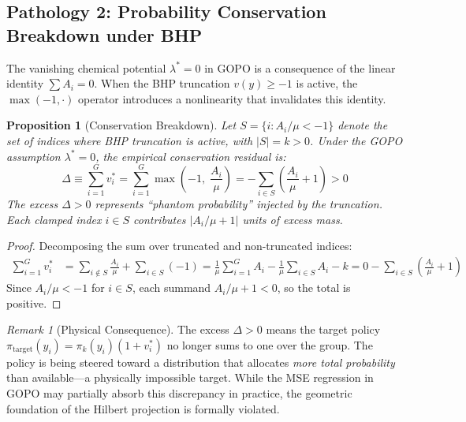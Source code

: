 \documentclass[11pt]{article}
\newtheorem{proposition}[theorem]{Proposition}
\theoremstyle{definition}
\theoremstyle{remark}
\newtheorem{remark}[theorem]{Remark}
\newcommand{\pik}{\pi_k}
\begin{document}
\subsection{Pathology 2: Probability Conservation Breakdown under BHP}
\label{subsec:bhp_break}

The vanishing chemical potential $\lambda^* = 0$ in GOPO is a consequence of the linear identity $\sum A_i = 0$. When the BHP truncation $v(y) \geq -1$ is active, the $\max(-1, \cdot)$ operator introduces a nonlinearity that invalidates this identity.

\begin{proposition}[Conservation Breakdown]
\label{prop:conservation_break}
Let $S = \{i : A_i/\mu < -1\}$ denote the set of indices where BHP truncation is active, with $|S| = k > 0$. Under the GOPO assumption $\lambda^* = 0$, the empirical conservation residual is:
\begin{equation}
    \Delta \equiv \sum_{i=1}^G v_i^* = \sum_{i=1}^G \max\!\left(-1,\; \frac{A_i}{\mu}\right) = -\sum_{i \in S}\left(\frac{A_i}{\mu} + 1\right) > 0
\end{equation}
The excess $\Delta > 0$ represents ``phantom probability'' injected by the truncation. Each clamped index $i \in S$ contributes $|A_i/\mu + 1|$ units of excess mass.
\end{proposition}

\begin{proof}
Decomposing the sum over truncated and non-truncated indices:
\begin{align}
    \sum_{i=1}^G v_i^* &= \sum_{i \notin S} \frac{A_i}{\mu} + \sum_{i \in S} (-1) 
    = \frac{1}{\mu}\sum_{i=1}^G A_i - \frac{1}{\mu}\sum_{i \in S} A_i - k
    = 0 - \sum_{i \in S}\!\left(\frac{A_i}{\mu} + 1\right)
\end{align}
Since $A_i/\mu < -1$ for $i \in S$, each summand $A_i/\mu + 1 < 0$, so the total is positive.
\end{proof}

\begin{remark}[Physical Consequence]
The excess $\Delta > 0$ means the target policy $\pi_{\text{target}}(y_i) = \pik(y_i)(1 + v_i^*)$ no longer sums to one over the group. The policy is being steered toward a distribution that allocates \emph{more total probability} than available---a physically impossible target. While the MSE regression in GOPO may partially absorb this discrepancy in practice, the geometric foundation of the Hilbert projection is formally violated.
\end{remark}
\end{document}
